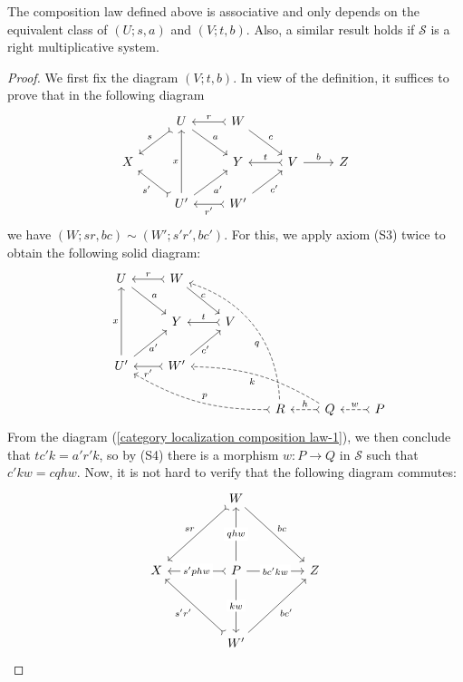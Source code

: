 \begin{proposition}\label{category localization composition law}
The composition law defined above is associative and only depends on the equivalent class of $(U;s,a)$ and $(V;t,b)$. Also, a similar result holds if $\mathcal{S}$ is a right multiplicative system.
\end{proposition}
\begin{proof}
We first fix the diagram $(V;t,b)$. In view of the definition, it suffices to prove that in the following diagram
\begin{equation}\label{category localization composition law-1}
\begin{tikzcd}
&U\ar[ld,swap,"s",tail]\ar[rd,"a"]&W\ar[l,swap,"r",tail]\ar[rd,"c"]&&\\
X&&Y&V\ar[l,swap,"t",tail]\ar[r,"b"]&Z\\
&U'\ar[lu,"s'",tail]\ar[ru,swap,"a'"]\ar[uu,"x"]&W'\ar[l,"r'",tail]\ar[ru,swap,"c'"]&&
\end{tikzcd}
\end{equation}
we have $(W;sr,bc)\sim(W';s'r',bc')$. For this, we apply axiom (S3) twice to obtain the following solid diagram:
\begin{equation}\label{category localization composition law-2}
\begin{tikzcd}[row sep=7mm, column sep=8mm]
&U\ar[rd,"a"]&W\ar[l,swap,"r",tail]\ar[rd,"c"{anchor=south}]&&\\
&&Y&V\ar[l,swap,"t",tail]&\\
&U'\ar[ru,swap,"a'"{anchor=north},pos=0.6]\ar[uu,"x"]&W'\ar[l,"r'",tail]\ar[ru,swap,"c'"{anchor=north}]&&\\
&&&&R\ar[lluuu,bend right=35pt,"q",dashed,pos=0.4]\ar[lllu,"p",tail,bend left=15pt,swap,dashed]&Q\ar[l,"h",tail,swap,dashed]\ar[lllu,"k",dashed,bend right=15pt]&P\ar[l,dashed,swap,"w",tail]
\end{tikzcd}
\end{equation}
From the diagram (\ref{category localization composition law-1}), we then conclude that $tc'k=a'r'k$, so by (S4) there is a morphism $w:P\to Q$ in $\mathcal{S}$ such that $c'kw=cqhw$. Now, it is not hard to verify that the following diagram commutes:
\[\begin{tikzcd}[row sep=15mm, column sep=15mm]
&W\ar[ld,swap,"sr",tail]\ar[rd,"bc"]&\\
X&P\ar[r,"bc'kw"description]\ar[l,swap,"s'phw"description,tail]\ar[u,"qhw"description]\ar[d,"kw"description]&Z\\
&W'\ar[lu,"s'r'",tail]\ar[ru,swap,"bc'"]&

\end{tikzcd}\]
\end{proof}
